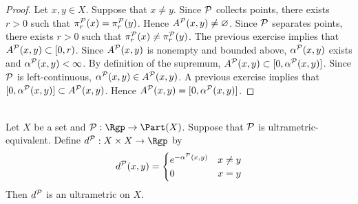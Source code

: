 \documentclass{book}
\begin{document}
\begin{proof}
	Let $x,y \in X$. Suppose that $x \neq y$. Since $\mathcal{P}$ collects points, there exists $r > 0$ such that $\pi^{\mathcal{P}}_r(x) = \pi^{\mathcal{P}}_r(y)$. Hence $A^{\mathcal{P}}(x,y) \neq \varnothing$. Since $\mathcal{P}$ separates points, there exists $r > 0$ such that $\pi^{\mathcal{P}}_r(x) \neq \pi^{\mathcal{P}}_r(y)$. The previous exercise implies that $A^{\mathcal{P}}(x,y) \subset [0, r)$. Since $A^{\mathcal{P}}(x,y)$ is nonempty and bounded above, $\alpha^{\mathcal{P}}(x,y)$ exists and $\alpha^{\mathcal{P}}(x,y) < \infty$. By definition of the supremum, $A^{\mathcal{P}}(x,y) \subset [0, \alpha^{\mathcal{P}}(x,y)]$. Since $\mathcal{P}$ is left-continuous, $\alpha^{\mathcal{P}}(x,y) \in A^{\mathcal{P}}(x,y)$. A previous exercise implies that $[0, \alpha^{\mathcal{P}}(x,y)] \subset A^{\mathcal{P}}(x,y)$. Hence $A^{\mathcal{P}}(x,y) = [0, \alpha^{\mathcal{P}}(x,y)]$.
\end{proof}

\begin{ex}  \\ 
	Let $X$ be a set and $\MP: \Rgp \rightarrow \Part(X)$. Suppose that $\mathcal{P}$ is ultrametric-equivalent. Define $d^{\MP}: X \times X \rightarrow \Rgp$ by 
	\[
	d^{\mathcal{P}}(x,y) =
	\begin{cases}
		e^{-\alpha^{\mathcal{P}}(x,y)} & x \neq y \\
		0 &  x = y
	\end{cases}
	\]
	Then $d^{\mathcal{P}}$ is an ultrametric on $X$.
\end{ex}
\end{document}
